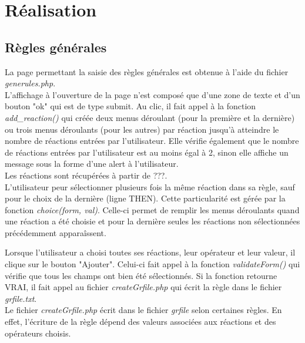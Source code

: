 \chapter{Réalisation}

\section{Règles générales}
La page permettant la saisie des règles générales est obtenue à l'aide du fichier \emph{generules.php}.\\
L'affichage à l'ouverture de la page n'est composé que d'une zone de texte et d'un bouton "ok" qui est de type submit. Au clic, il fait appel à la fonction \emph{add\_reaction()} qui créée deux menus déroulant (pour la première et la dernière) ou trois menus déroulants (pour les autres) par réaction jusqu'à atteindre le nombre de réactions entrées par l'utilisateur. Elle vérifie également que le nombre de réactions entrées par l'utilisateur est au moins égal à 2, sinon elle affiche un message sous la forme d'une alert à l'utilisateur.\\
Les réactions sont récupérées à partir de ???.\\

L'utilisateur peur sélectionner plusieurs fois la m\^eme réaction dans sa règle, sauf pour le choix de la dernière (ligne THEN). Cette particularité est gérée par la fonction \emph{choice(form, val)}. Celle-ci permet de remplir les menus déroulants quand une réaction a été choisie et pour la dernière seules les réactions non sélectionnées précédemment appara\^issent.

Lorsque l'utilisateur a choisi toutes ses réactions, leur opérateur et leur valeur, il clique sur le bouton "Ajouter". Celui-ci fait appel à la fonction \emph{validateForm()} qui vérifie que tous les champs ont bien été sélectionnés. Si la fonction retourne VRAI, il fait appel au fichier \emph{createGrfile.php} qui écrit la règle dans le fichier \emph{grfile.txt}.\\
Le fichier \emph{createGrfile.php} écrit dans le fichier \emph{grfile} selon certaines règles. En effet, l'écriture de la règle dépend des valeurs associées aux réactions et des opérateurs choisis.\\

